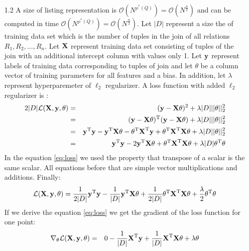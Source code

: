 \documentclass[10pt,a4paper]{article}
\begin{document}
\begin{enumerate}
\item[1.2]
A size of listing representation is $\mathcal{O}(N^{\rho^*(Q)})=\mathcal{O}(N^{\frac{n}{2}})$ and can be computed in time $\mathcal{O}(N^{\rho^*(Q)})=\mathcal{O}(N^{\frac{n}{2}})$. Let $|D|$ represent a size the of training data set which is the number of tuples in the join of all relations $R_1, R_2, ..., R_n$. Let $\textbf{\text{{X}}}$ represent training data set consisting of tuples of the join with an additional intercept column with values only 1. Let $\textbf{\text{{y}}}$ represent labels of training data corresponding to tuples of join and let $\theta$ be a column vector of training parameters for all features and a bias. In addition, let $\lambda$ represent hyperparemeter of $\ell_2$ regularizer.
A loss function with added $\ell_2$ regularizer is :
\begin{eqnarray}
2|D|\mathcal{L}(\textbf{\text{{X}}},\textbf{\text{{y}}}, \mathbf{\theta})  &=& (\textbf{\text{{y}}} - \textbf{\text{{X}}}\mathbf{\theta})^2 \nonumber + \lambda |D| ||\mathbf{\theta}||_2^2\\
			&=& (\textbf{\text{{y}}} - \textbf{\text{{X}}}\mathbf{\theta}) ^ \text{T}(\textbf{\text{{y}}} - \textbf{\text{{X}}}\mathbf{\theta}) + \lambda |D| ||\mathbf{\theta}||_2^2 \nonumber \\
&=&\textbf{\text{{y}}} ^ \text{T}\textbf{\text{{y}}} - \textbf{\text{{y}}} ^ \text{T}\textbf{\text{{X}}}\mathbf{\theta}
- \mathbf{\theta} ^ \text{T}\textbf{\text{{X}}} ^ \text{T} \textbf{\text{{y}}}
+ \mathbf{\theta} ^ \text{T}\textbf{\text{{X}}} ^ \text{T}\textbf{\text{{X}}}\mathbf{\theta} + \lambda |D| |\mathbf{\theta}||_2^2 \nonumber \\
&=&
\textbf{\text{{y}}} ^ \text{T}\textbf{\text{{y}}} - 2 \textbf{\text{{y}}} ^ \text{T}\textbf{\text{{X}}}\mathbf{\theta}
+ \mathbf{\theta} ^ \text{T}\textbf{\text{{X}}} ^ \text{T}\textbf{\text{{X}}}\mathbf{\theta} + \lambda |D| \mathbf{\theta} ^ \text{T}\mathbf{\theta}
\label{eq:loss}
\end{eqnarray}
In the equation \ref{eq:loss} we used the property that transpose of a scalar is the same scalar. All equations before that are simple vector multiplications and additions. 
Finally: 
$$\mathcal{L}(\textbf{\text{{X}}},\textbf{\text{{y}}}, \mathbf{\theta}) = 
\frac{1}{2|D|} \textbf{\text{{y}}} ^ \text{T}\textbf{\text{{y}}} - \frac{1}{|D|} \textbf{\text{{y}}} ^ \text{T}\textbf{\text{{X}}}\mathbf{\theta}
+ \frac{1}{2|D|}\mathbf{\theta} ^ \text{T}\textbf{\text{{X}}} ^ \text{T}\textbf{\text{{X}}}\mathbf{\theta} + 
\frac{\lambda}{2} \mathbf{\theta} ^ \text{T}\mathbf{\theta}
$$
If we derive the equation \ref{eq:loss} we get the gradient of the loss function for one point:
\begin{eqnarray}
\nabla_{\mathbf{\theta}} \mathcal{L}(\mat{X},\vect{y}, \mathbf{\theta}) &=& 0  - \frac{1}{|D|}\transpose{\mat{X}}\vect{y} + \frac{1}{|D|}\transpose{\mat{X}}\mat{X}\mathbf{\theta} + \lambda \mathbf{\theta} \nonumber \\

\end{eqnarray}
\end{enumerate}
\end{document}
